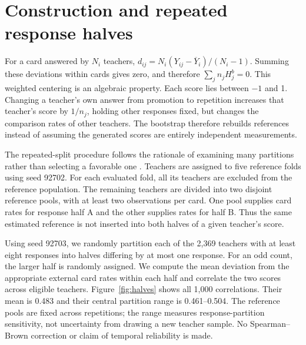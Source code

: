 
\title{}
\author{\authors}

\maketitle\draftlegend\color{reused}
\section{Construction and repeated response halves}
For a card answered by $N_i$ teachers, $d_{ij}=N_i(Y_{ij}-\overline Y_i)/(N_i-1)$. Summing these deviations within cards gives zero, and therefore $\sum_j n_jH^b_j=0$. This weighted centering is an algebraic property. Each score lies between $-1$ and 1. Changing a teacher's own answer from promotion to repetition increases that teacher's score by $1/n_j$, holding other responses fixed, but changes the comparison rates of other teachers. The bootstrap therefore rebuilds references instead of assuming the generated scores are entirely independent measurements.

\color{reused}
The repeated-split procedure follows the rationale of examining many partitions rather than selecting a favorable one \citep{parsons}. Teachers are assigned to five reference folds using seed 92702. For each evaluated fold, all its teachers are excluded from the reference population. The remaining teachers are divided into two disjoint reference pools, with at least two observations per card. One pool supplies card rates for response half A and the other supplies rates for half B. Thus the same estimated reference is not inserted into both halves of a given teacher's score.

Using seed 92703, we randomly partition each of the 2,369 teachers with at least eight responses into halves differing by at most one response. For an odd count, the larger half is randomly assigned. We compute the mean deviation from the appropriate external card rates within each half and correlate the two scores across eligible teachers. Figure~\ref{fig:halves} shows all 1,000 correlations. Their mean is 0.483 and their central partition range is 0.461--0.504. The reference pools are fixed across repetitions; the range measures response-partition sensitivity, not uncertainty from drawing a new teacher sample. No Spearman--Brown correction or claim of temporal reliability is made.



